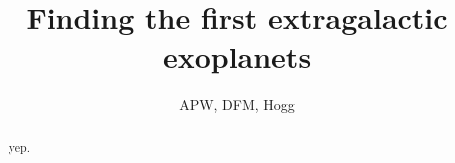 \documentclass[letterpaper,12pt,preprint]{aastex}
\begin{document}
\title{Finding the first extragalactic exoplanets}
\author{APW, DFM, Hogg}



\begin{abstract}
yep.

\end{abstract}

\section*{}
\end{document}
